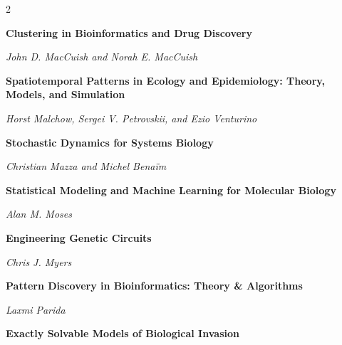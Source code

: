 \begin{multicols}{2}
\begin{minipage}{\linewidth}
\end{minipage}\par\medskip
\par\noindent\begin{minipage}{\linewidth}
\raggedright
\textbf{Clustering in Bioinformatics and Drug Discovery}\par
\textit{John D. MacCuish and Norah E. MacCuish}
\end{minipage}\par\medskip
\par\noindent\begin{minipage}{\linewidth}
\raggedright
\textbf{Spatiotemporal Patterns in Ecology and Epidemiology: Theory, Models, and Simulation}\par
\textit{Horst Malchow, Sergei V. Petrovskii, and Ezio Venturino}
\end{minipage}\par\medskip
\par\noindent\begin{minipage}{\linewidth}
\raggedright
\textbf{Stochastic Dynamics for Systems Biology}\par
\textit{Christian Mazza and Michel Benaïm}
\end{minipage}\par\medskip
\par\noindent\begin{minipage}{\linewidth}
\raggedright
\textbf{Statistical Modeling and Machine Learning for Molecular Biology}\par
\textit{Alan M. Moses}
\end{minipage}\par\medskip
\par\noindent\begin{minipage}{\linewidth}
\raggedright
\textbf{Engineering Genetic Circuits}\par
\textit{Chris J. Myers}
\end{minipage}\par\medskip
\par\noindent\begin{minipage}{\linewidth}
\raggedright
\textbf{Pattern Discovery in Bioinformatics: Theory \& Algorithms}\par
\textit{Laxmi Parida}
\end{minipage}\par\medskip
\par\noindent\begin{minipage}{\linewidth}
\raggedright
\textbf{Exactly Solvable Models of Biological Invasion}\par

\end{minipage}
\end{multicols}
